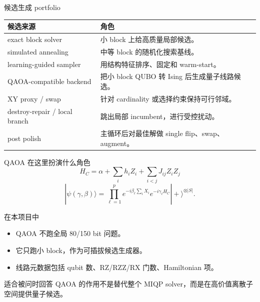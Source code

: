 \documentclass[aspectratio=169]{beamer}
\begin{document}
\begin{frame}{候选生成 portfolio}
\small
\begin{tabularx}{\linewidth}{p{3.2cm}Y}
\toprule
候选来源 & 角色 \\
\midrule
exact block solver & 小 block 上给高质量局部候选。\\
simulated annealing & 中等 block 的随机化搜索基线。\\
learning-guided sampler & 用结构特征排序、固定和 warm-start。\\
QAOA-compatible backend & 把小 block QUBO 转 Ising 后生成量子线路候选。\\
XY proxy / swap & 针对 cardinality 或选择约束保持可行邻域。\\
destroy-repair / local branch & 跳出局部 incumbent，进行受控扰动。\\
post polish & 主循环后对最佳解做 single flip、swap、augment。\\
\bottomrule
\end{tabularx}
\end{frame}

\begin{frame}{QAOA 在这里扮演什么角色}
\small
\[
H_C=\alpha+\sum_i h_iZ_i+\sum_{i<j}J_{ij}Z_iZ_j
\]
\[
|\psi(\gamma,\beta)\rangle=
\prod_{\ell=1}^{p}e^{-i\beta_\ell\sum_iX_i}e^{-i\gamma_\ell H_C}|+\rangle^{\otimes |S|}.
\]
\begin{block}{在本项目中}
\begin{itemize}
  \item QAOA 不跑全局 80/150 bit 问题。
  \item 它只跑小 block，作为可插拔候选生成器。
  \item 线路元数据包括 qubit 数、RZ/RZZ/RX 门数、Hamiltonian 项。
\end{itemize}
\end{block}
\begin{alertblock}{适合被问时回答}
QAOA 的作用不是替代整个 MIQP solver，而是在高价值离散子空间提供量子候选。
\end{alertblock}
\end{frame}
\end{document}
